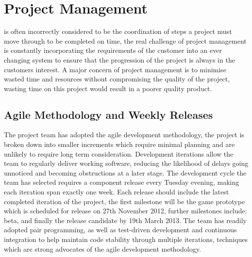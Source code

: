 \chapter[Project Management]{Project Management}
\label{ch:management}


 is often incorrectly considered to be the coordination of steps a project must move through to be completed on time, the real challenge of project management is constantly incorporating the requirements of the customer into an ever changing system to ensure that the progression of the project is always in the customers interest. A major concern of project management is to minimise wasted time and resources without compromising the quality of the project, wasting time on this project would result in a poorer quality product.






\section{Agile Methodology and Weekly Releases}
The project team has adopted the agile development methodology, the project is broken down into smaller increments which require minimal planning and are unlikely to require long term consideration. Development iterations allow the team to regularly deliver working software, reducing the likelihood of delays going unnoticed and becoming obstructions at a later stage. The development cycle the team has selected requires a component release every Tuesday evening, making each iteration span exactly one week. Each release should include the latest completed iteration of the project, the first milestone will be the game prototype which is scheduled for release on 27th November 2012, further milestones include: beta, and finally the release candidate by 19th March 2013.
The team has readily adopted pair programming, as well as test-driven development and continuous integration to help maintain code stability through multiple iterations, techniques which are strong advocates of the agile development methodology.

